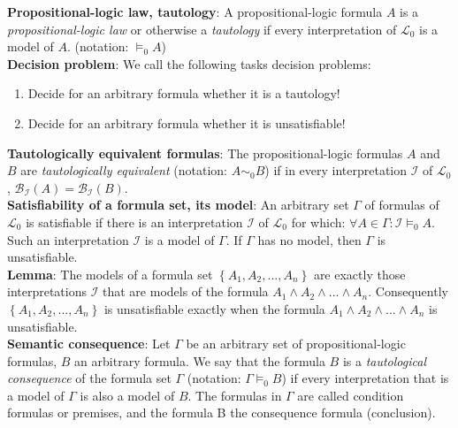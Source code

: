 \documentclass[margin=0px]{article}
\begin{document}
\noindent \textbf{Propositional-logic law, tautology}: A propositional-logic formula $A$ is a \textit{propositional-logic law} or otherwise a \textit{tautology} if every interpretation of $\mathcal{L}_{0}$ is a model of $A$. (notation: $\models_{0} A$)\\

\noindent \textbf{Decision problem}: We call the following tasks decision problems:
\begin{enumerate}
    \item	Decide for an arbitrary formula whether it is a tautology!

    \item	Decide for an arbitrary formula whether it is unsatisfiable!
\end{enumerate}

\noindent \textbf{Tautologically equivalent formulas}: The propositional-logic formulas $A$ and $B$ are \textit{tautologically equivalent} (notation: $A \sim _{0} B$) if in every interpretation $\mathcal{I}$ of $\mathcal{L}_{0}$, $\mathcal{B}_{\mathcal{I}}(A)=\mathcal{B}_{\mathcal{I}}(B)$.\\

\noindent \textbf{Satisfiability of a formula set, its model}: An arbitrary set $\Gamma$ of formulas of $\mathcal{L}_{0}$ is
satisfiable if there is an interpretation $\mathcal{I}$ of $\mathcal{L}_{0}$ for which: $\forall A \in \Gamma: \mathcal{I} \models_{0} A$.
Such an interpretation $\mathcal{I}$ is a model of $\Gamma$. If $\Gamma$ has no model, then $\Gamma$ is unsatisfiable.\\

\noindent \textbf{Lemma}: The models of a formula set $\left\{A_{1},A_{2},...,A_{n}\right\}$ are exactly those interpretations $\mathcal{I}$
that are models of the formula $A_{1} \wedge A_{2} \wedge ... \wedge A_{n}$. Consequently $\left\{A_{1},A_{2},...,A_{n}\right\}$
is unsatisfiable exactly when the formula $A_{1} \wedge A_{2} \wedge ... \wedge A_{n}$ is unsatisfiable.\\

\noindent \textbf{Semantic consequence}: Let $\Gamma$ be an arbitrary set of propositional-logic formulas, $B$ an arbitrary formula.
We say that the formula $B$ is a \textit{tautological consequence} of the formula set $\Gamma$ (notation: $\Gamma \models_{0} B$) if every interpretation that is a model of $\Gamma$ is also a model of $B$. The formulas in $\Gamma$ are called condition formulas or premises,
and the formula B the consequence formula (conclusion).\\
\end{document}

